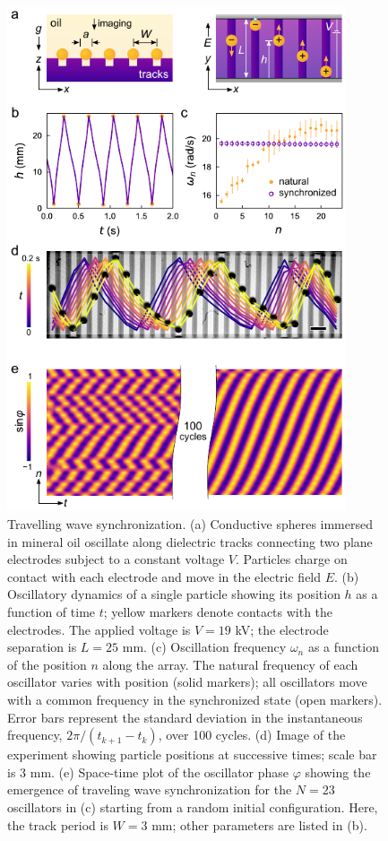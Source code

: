 \begin{figure}[p!]
    \centering
    \includegraphics[width=10cm]{figures/3_1.pdf}
    \caption{Travelling wave synchronization. (a) Conductive spheres immersed in mineral oil oscillate along dielectric tracks connecting two plane electrodes subject to a constant voltage $V$. Particles charge on contact with each electrode and move in the electric field $E$. (b) Oscillatory dynamics of a single particle showing its position $h$  as a function of time $t$; yellow markers denote contacts with the electrodes. The applied voltage is $V=19$ kV; the electrode separation is $L=25$ mm. (c) Oscillation frequency $\omega_n$ as a function of the position $n$ along the array. The natural frequency of each oscillator varies with position (solid markers); all oscillators move with a common frequency in the synchronized state (open markers). Error bars represent the standard deviation in the instantaneous frequency, $2\pi/(t_{k+1}-t_k)$, over 100 cycles. (d) Image of the experiment showing particle positions at successive times; scale bar is 3 mm. (e) Space-time plot of the oscillator phase $\varphi$ showing the emergence of traveling wave synchronization for the $N=23$ oscillators in (c) starting from a random initial configuration.  Here, the track period is $W=3$ mm; other parameters are listed in (b).}
    \label{fig:3.1}
\end{figure}


